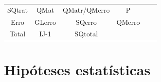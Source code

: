 \documentclass[12pt,brazil,]{book}
\begin{document}
\begin{longtable}[]{@{}cccccc@{}}
\begin{minipage}[t]{0.14\columnwidth}
SQtrat\strut
\end{minipage} & \begin{minipage}[t]{0.14\columnwidth}\centering
QMat\strut
\end{minipage} & \begin{minipage}[t]{0.14\columnwidth}\centering
QMatr/QMerro\strut
\end{minipage} & \begin{minipage}[t]{0.14\columnwidth}\centering
P\strut
\end{minipage}\tabularnewline
\begin{minipage}[t]{0.14\columnwidth}\centering
Erro\strut
\end{minipage} & \begin{minipage}[t]{0.14\columnwidth}\centering
GLerro\strut
\end{minipage} & \begin{minipage}[t]{0.14\columnwidth}\centering
SQerro\strut
\end{minipage} & \begin{minipage}[t]{0.14\columnwidth}\centering
QMerro\strut
\end{minipage} & \begin{minipage}[t]{0.14\columnwidth}\centering
\strut
\end{minipage} & \begin{minipage}[t]{0.14\columnwidth}\centering
\strut
\end{minipage}\tabularnewline
\begin{minipage}[t]{0.14\columnwidth}\centering
Total\strut
\end{minipage} & \begin{minipage}[t]{0.14\columnwidth}\centering
IJ-1\strut
\end{minipage} & \begin{minipage}[t]{0.14\columnwidth}\centering
SQtotal\strut
\end{minipage} & \begin{minipage}[t]{0.14\columnwidth}\centering
\strut
\end{minipage} & \begin{minipage}[t]{0.14\columnwidth}\centering
\strut
\end{minipage} & \begin{minipage}[t]{0.14\columnwidth}\centering
\strut
\end{minipage}\tabularnewline
\bottomrule
\end{longtable}

\hypertarget{hipoteses-estatisticas}{%
\section{Hipóteses estatísticas}\label{hipoteses-estatisticas}}
\end{document}

